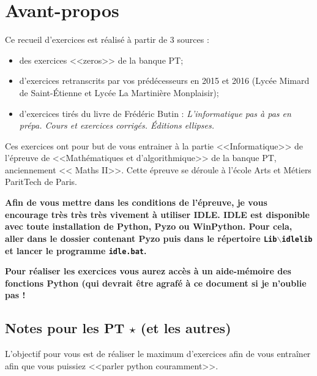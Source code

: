 \documentclass[10pt,fleqn]{article} %
\begin{document}


\newpage
\def\columnseprulecolor{\color{bleuxp}}
\setlength{\columnseprule}{0.4pt} 

\section{Avant-propos}
\footnotesize{
Ce recueil d'exercices est réalisé à partir de 3 sources : 
\begin{itemize}
\item des exercices <<zeros>> de la banque PT; 
\item d'exercices retranscrits par vos prédécesseurs en 2015 et 2016 (Lycée Mimard de Saint-Étienne et Lycée La Martinière Monplaisir);
\item d'exercices tirés du livre de Frédéric Butin : \textit{L'informatique pas à pas en prépa. Cours et exercices corrigés. Éditions ellipses.}
\end{itemize}

Ces exercices ont pour but de vous entrainer à la partie <<Informatique>> de l'épreuve de <<Mathématiques et d'algorithmique>> de la banque PT, anciennement << Maths II>>. Cette épreuve se déroule à l'école Arts et Métiers ParitTech de Paris.


\begin{warn}
\large{\textbf{
Afin de vous mettre dans les conditions de l'épreuve, je vous encourage très très très vivement à utiliser IDLE. IDLE est disponible avec toute installation de Python, Pyzo ou WinPython. 
Pour cela, aller dans le dossier contenant Pyzo puis dans le répertoire \texttt{Lib$\backslash$idlelib} et lancer le programme \texttt{idle.bat}.}

\textbf{Pour réaliser les exercices vous aurez accès à un aide-mémoire des fonctions Python  (qui devrait être agrafé à ce document si je n'oublie pas !}}
\end{warn}

\subsection*{Notes pour les PT $\star$ (et les autres)}

L'objectif pour vous est de réaliser le maximum d'exercices afin de vous entraîner afin que vous puissiez <<parler python couramment>>.  %


}
\end{document}
